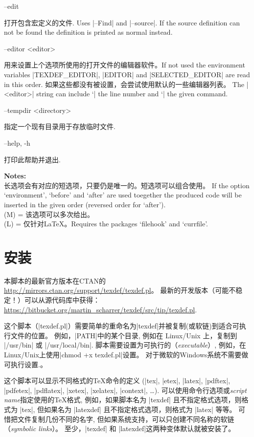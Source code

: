 \documentclass{article}
\newenvironment{options}{%
    \def\cstart{\begingroup\ttfamily\par\noindent\ignorespaces}%
    \def\csep{\endgroup\begingroup\list {}{}\item \relax}%
    \def\cend{\endlist\par\medskip\endgroup\cstart}%
    \cstart
}{%
    \endgroup
}
\begin{document}
\begin{options}
  --edit                                             \csep 打开包含宏定义的文件. Uses |--Find| and |--source|.
                                                           If the source definition can not be found the definition is printed as normal instead. \cend
  --editor <editor>                                  \csep 用来设置上个选项所使用的打开文件的编辑器软件。If not used the environment variables |TEXDEF_EDITOR|, |EDITOR| and
                                                       |SELECTED_EDITOR| are read in this order. 如果这些都没有被设置，会尝试使用默认的一些编辑器列表。
                                                       The |<editor>| string can include `|%
                                                       the line number and `|%
                                                       the given command.\cend
  --tempdir <directory>                              \csep 指定一个现有目录用于存放临时文件.\cend
  --help, -h                                         \csep 打印此帮助并退出.\cend
\end{options}

\noindent \textbf{Notes:}\\
长选项会有对应的短选项，只要仍是唯一的。短选项可以组合使用。
 If the option `environment', `before' and `after' are used toegether the
 produced code will be inserted in the given order (reversed order for `after').\\
 (M) = 该选项可以多次给出。\\
 (L) = 仅针对LaTeX。Requires the packages `filehook' and `currfile'.


\section{安装}\label{sec:install}

本脚本的最新官方版本在CTAN的\url{http://mirrors.ctan.org/support/texdef/texdef.pl}。
最新的开发版本（可能不稳定！）可以从源代码库中获得：
\url{https://bitbucket.org/martin_scharrer/texdef/src/tip/texdef.pl}.

这个脚本（|texdef.pl|）需要简单的重命名为|texdef|并被复制(或软链)到适合可执行文件的位置。
例如，|PATH|中的某个目录, 例如在 Linux/Unix 上，复制到 |/usr/bin| 或 |/usr/local/bin|.
脚本需要设置为可执行的（\emph{executable}）, 例如，在Linux/Unix上使用|chmod +x texdef.pl|设置。
对于微软的Windows系统不需要做可执行设置.。

这个脚本可以显示不同格式的TeX命令的定义
(|tex|, |etex|, |latex|, |pdftex|, |pdfetex|, |pdflatex|, |xetex|, |xelatex|, |context|, \ldots).
可以使用命令行选项或\emph{script name}指定使用的TeX格式,
例如，如果脚本名为 |texdef| 且不指定格式选项，则格式为 |tex|, 但如果名为 |latexdef| 且不指定格式选项，则格式为
 |latex| 等等。
可惜把文件复制几份不同的名字, 但如果系统支持，可以只创建不同名称的软链（\emph{symbolic links}）。
至少，|texdef| 和 |latexdef|这两种变体默认就被安装了。
\end{document}
